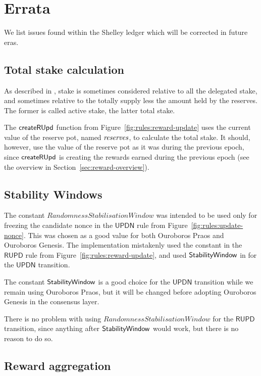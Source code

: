 \section{Errata}
\label{sec:errata}

We list issues found within the Shelley ledger which will be corrected in future eras.

\subsection{Total stake calculation}
\label{sec:errata:total-stake}

As described in \cite[3.4.3]{delegation_design}, stake is sometimes considered
relative to all the delegated stake, and sometimes relative to the
totally supply less the amount held by the reserves.
The former is called active stake, the latter total stake.


The $\mathsf{createRUpd}$ function from Figure~\ref{fig:rules:reward-update} uses the
current value of the reserve pot, named $\mathit{reserves}$, to calculate the total stake.
It should, however, use the value of the reserve pot as it was during the previous
epoch, since $\mathsf{createRUpd}$ is creating the rewards earned during the previous epoch
(see the overview in Section~\ref{sec:reward-overview}).

\subsection{Stability Windows}
\label{sec:errata:stability-windows}

The constant $RandomnessStabilisationWindow$ was intended to be used only
for freezing the candidate nonce in the $\mathsf{UPDN}$ rule
from Figure~\ref{fig:rules:update-nonce}.
This was chosen as a good value for both Ouroboros Praos and Ouroboros Genesis.
The implementation mistakenly used the constant in the $\mathsf{RUPD}$ rule
from Figure~\ref{fig:rules:reward-update}, and used $\mathsf{StabilityWindow}$
in for the $\mathsf{UPDN}$ transition.

The constant $\mathsf{StabilityWindow}$ is a good choice for the $\mathsf{UPDN}$
transition while we remain using Ouroboros Praos, but it will be changed before
adopting Ouroboros Genesis in the consensus layer.

There is no problem with using $RandomnessStabilisationWindow$ for the
$\mathsf{RUPD}$ transition, since anything after $\mathsf{StabilityWindow}$ would work,
but there is no reason to do so.

\subsection{Reward aggregation}
\label{sec:errata:reward-aggregation}


